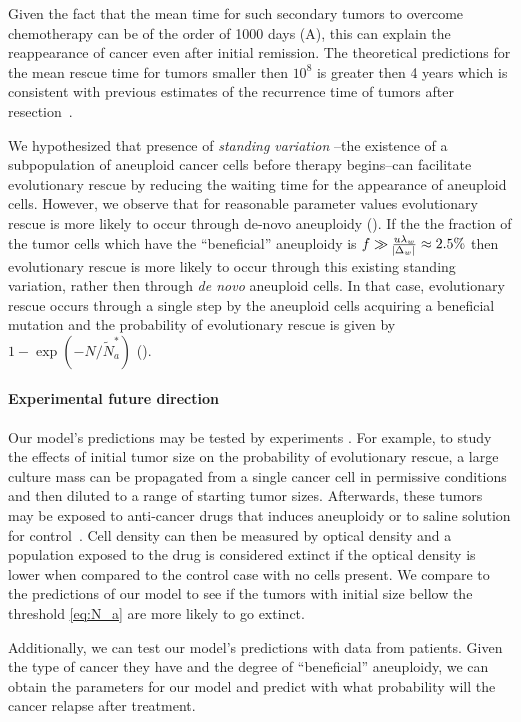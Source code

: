 \documentclass[12pt]{extarticle}
\begin{document}
Given the fact that the mean time for such secondary tumors to overcome chemotherapy can be of the order of 1000 days (A),
this can explain the reappearance of cancer even after initial remission. The theoretical predictions for the mean rescue time for tumors smaller then  $10^8$ is greater then 4 years which is consistent with previous estimates of the recurrence time of tumors after resection~\citep{avanzini2019cancer}. 

We hypothesized that presence of \emph{standing variation} 
--the existence of a subpopulation of aneuploid cancer cells before therapy begins--can facilitate evolutionary rescue by reducing the waiting time for the appearance of aneuploid cells. However, we observe that for reasonable parameter values evolutionary rescue is more likely to occur through de-novo aneuploidy (). If the the fraction of the tumor cells which have the ``beneficial'' aneuploidy is $f\gg\frac{u\lambda_w}{\abs{\Delta_w}}\approx2.5\%$ then evolutionary rescue is more likely to occur through this existing standing variation, rather then through \emph{de novo} aneuploid cells. In that case, evolutionary rescue occurs through a single step by the aneuploid cells acquiring a beneficial mutation and the probability of evolutionary rescue is given by $1-\exp\left(-N/\tilde{N}_a^*\right)$  ().

\paragraph{Experimental future direction}
Our model's predictions may be tested by experiments \citep{martin2013probability}. For example, to study the effects of initial tumor size on the probability of evolutionary rescue, a large culture mass can be propagated from a single cancer cell in permissive conditions and then diluted to a  range of starting tumor sizes. Afterwards, these tumors may be exposed to anti-cancer drugs that induces aneuploidy or to saline solution for control~\citep{ippolito2021gene}. 
Cell density can then be measured by optical density and a population exposed to the drug is considered extinct if the optical density is lower when compared to the control case with no cells present. We compare to the predictions of our model to see if the tumors with initial size bellow the threshold \eqref{eq:N_a} are more likely to go extinct.   

Additionally, we can test our model's predictions with data from patients. Given the type of cancer they have and the degree of ``beneficial'' aneuploidy,  we can obtain the parameters for our model and predict with what probability will the cancer relapse after treatment.
\end{document}
